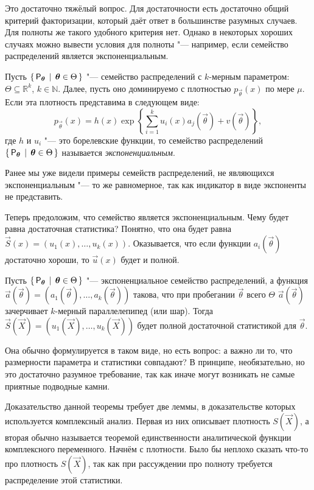 Это достаточно тяжёлый вопрос. Для достаточности есть достаточно общий критерий факторизации, который даёт ответ в большинстве разумных случаев. Для полноты же такого удобного критерия нет. Однако в некоторых хороших случаях можно вывести условия для полноты "--- например, если семейство распределений является экспоненциальным.
\begin{definition}
	Пусть $\set{\mathsf{P}_{\bm{\theta}}\,|\,\bm{\theta} \in \Theta}$ "--- семейство распределений с $k$-мерным параметром: $\Theta \subseteq \mathbb{R}^{k}$, $k \in \mathbb{N}$. Далее, пусть оно доминируемо с плотностью $p_{\vec{\theta}}(x)$ по мере $\mu$. Если эта плотность представима в следующем виде:
	\[
		p_{\vec{\theta}}(x) = h(x)\exp\left\{\sum_{i = 1}^{k}u_{i}(x)a_{j}(\vec{\theta}) + v(\vec{\theta})\right\},
	\]
	где $h$ и $u_{i}$ "--- это борелевские функции, то семейство распределений $\set{\mathsf{P}_{\bm{\theta}}\,|\,\bm{\theta} \in \Theta}$ называется \emph{экспоненциальным}.
\end{definition}
Ранее мы уже видели примеры семейств распределений, не являющихся экспоненциальным "--- то же равномерное, так как индикатор в виде экспоненты не представить.

Теперь предоложим, что семейство является экспоненциальным. Чему будет равна достаточная статистика? Понятно, что она будет равна $\vec{S}(x) = (u_{1}(x), \ldots, u_{k}(x))$. Оказывается, что если функции $a_{i}(\vec{\theta})$ достаточно хороши, то $\vec{u}(x)$ будет и полной.
\begin{theorem}
	Пусть $\set{\mathsf{P}_{\bm{\theta}}\,|\,\bm{\theta} \in \Theta}$ "--- экспоненциальное семейство распределений, а функция $\vec{a}(\vec{\theta}) = (a_{1}(\vec{\theta}), \ldots, a_{k}(\vec{\theta}))$ такова, что при пробегании $\vec{\theta}$ всего $\Theta$ $\vec{a}(\vec{\theta})$ зачерчивает $k$-мерный параллелепипед (или шар). Тогда $\vec{S}(\vec{X}) = (u_{1}(\vec{X}), \ldots, u_{k}(\vec{X}))$ будет полной достаточной статистикой для $\vec{\theta}$.
\end{theorem}
Она обычно формулируется в таком виде, но есть вопрос: а важно ли то, что размерности параметра и статистики совпадают? В принципе, необязательно, но это достаточно разумное требование, так как иначе могут возникать не самые приятные подводные камни.

Доказательство данной теоремы требует две леммы, в доказательстве которых используется комплексный анализ. Первая из них описывает плотность $S(\vec{X})$, а вторая обычно называется теоремой единственности аналитической функции комплексного переменного. Начнём с плотности. Было бы неплохо сказать что-то про плотность $S(\vec{X})$, так как при рассуждении про полноту требуется распределение этой статистики.

